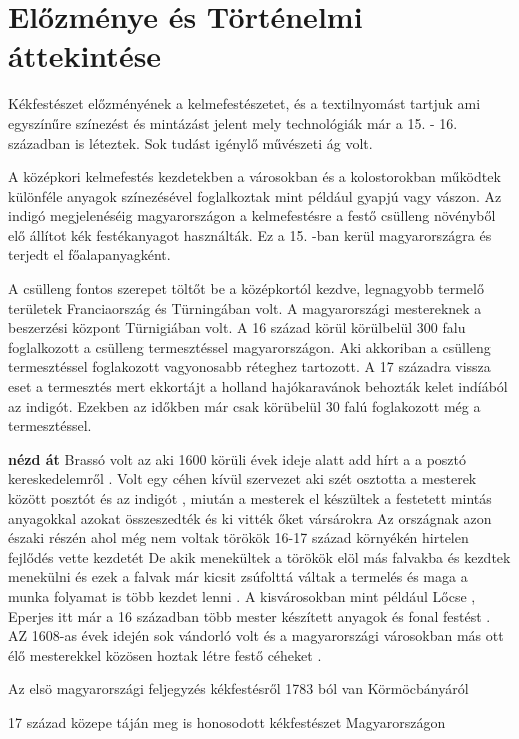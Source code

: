 \documentclass[fontsize=12pt, appendixprefix=true]{scrreprt}
\begin{document}
\section{Előzménye és Történelmi áttekintése}
Kékfestészet előzményének a kelmefestészetet, és a textilnyomást tartjuk ami egyszínűre színezést és mintázást jelent mely technológiák már a 15. - 16. században is léteztek. Sok tudást igénylő művészeti ág volt.

A középkori kelmefestés kezdetekben a városokban és a kolostorokban működtek különféle anyagok színezésével foglalkoztak mint például gyapjú vagy vászon. 
Az indigó megjelenéséig magyarországon a kelmefestésre a festő csülleng növényből elő állítot kék festékanyagot használták. Ez a 15. -ban kerül magyarországra és terjedt el főalapanyagként.

A csülleng fontos szerepet töltőt be a középkortól kezdve, legnagyobb termelő területek Franciaország és Türningában volt. A magyarországi mestereknek a beszerzési központ Türnigiában volt.
A 16 század körül körülbelül 300 falu foglalkozott a csülleng termesztéssel magyarországon. Aki akkoriban a csülleng termesztéssel foglakozott vagyonosabb réteghez tartozott. A 17 századra vissza eset a termesztés mert ekkortájt a holland hajókaravánok behozták kelet indíából az indigót.
Ezekben az időkben már csak körübelül 30 falú foglakozott még a termesztéssel.

\textbf{nézd át}
Brassó volt az  aki 1600 körüli évek ideje alatt add hírt a a posztó kereskedelemről .
Volt egy céhen kívül szervezet aki szét osztotta a mesterek között  posztót és az indigót , miután a mesterek el készültek a festetett mintás anyagokkal azokat összeszedték és ki vitték őket vársárokra 
Az országnak azon északi részén ahol még nem voltak törökök 16-17 század környékén hirtelen fejlődés vette kezdetét 
De akik menekültek a törökök elöl más falvakba és kezdtek menekülni és ezek a falvak már kicsit zsúfolttá váltak a termelés és maga a munka folyamat is több kezdet lenni .
A kisvárosokban mint például Lőcse , Eperjes itt már a 16 században több mester  készített anyagok és fonal festést .
AZ 1608-as évek idején sok vándorló volt és a magyarországi városokban más ott élő mesterekkel közösen hoztak létre festő céheket .

Az elsö magyarországi feljegyzés kékfestésről 1783 ból van Körmöcbányáról 

17 század közepe táján  meg is honosodott kékfestészet Magyarországon 
\end{document}
